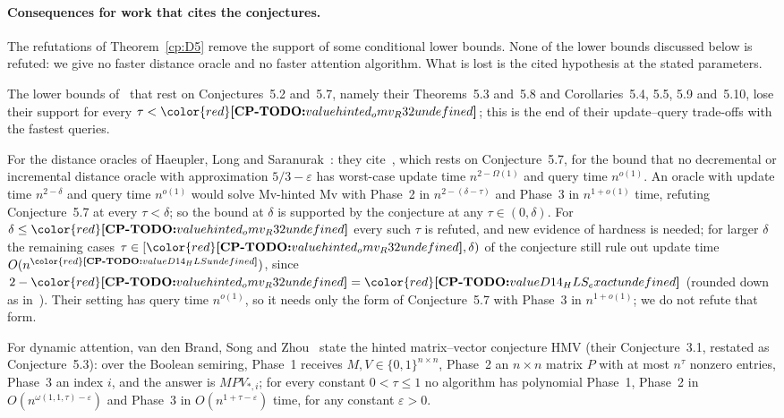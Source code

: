 \documentclass[11pt]{article}
\makeatletter
\theoremstyle{definition}
\theoremstyle{remark}
\DeclareRobustCommand{\CPTODO}[1]{{\color{red}\textbf{[CP-TODO:} #1\textbf{]}}}
\providecommand{\eps}{\varepsilon}
\newcommand{\cpv}[1]{\ifcsname cpv@#1\endcsname\csname cpv@#1\endcsname\else\CPTODO{value #1 undefined}\fi}
\makeatother
\begin{document}
\paragraph{Consequences for work that cites the conjectures.}\label{cp:D14}
The refutations of Theorem~\ref{cp:D5} remove the support of some conditional lower bounds. None of the lower bounds discussed below is refuted: we give no faster distance oracle and no faster attention algorithm. What is lost is the cited hypothesis at the stated parameters.

The lower bounds of~\cite{BNS19} that rest on Conjectures~5.2 and~5.7, namely their Theorems~5.3 and~5.8 and Corollaries~5.4, 5.5, 5.9 and~5.10, lose their support for every $\tau<\cpv{hinted_omv_R32}$; this is the end of their update--query trade-offs with the fastest queries.

For the distance oracles of Haeupler, Long and Saranurak~\cite{HLS24}: they cite~\cite[Corollary~5.10]{BNS19}, which rests on Conjecture~5.7, for the bound that no decremental or incremental distance oracle with approximation $5/3-\eps$ has worst-case update time $n^{2-\Omega(1)}$ and query time $n^{o(1)}$. An oracle with update time $n^{2-\delta}$ and query time $n^{o(1)}$ would solve Mv-hinted Mv with Phase~2 in $n^{2-(\delta-\tau)}$ and Phase~3 in $n^{1+o(1)}$ time, refuting Conjecture~5.7 at every $\tau<\delta$; so the bound at $\delta$ is supported by the conjecture at any $\tau\in(0,\delta)$. For $\delta\le\cpv{hinted_omv_R32}$ every such $\tau$ is refuted, and new evidence of hardness is needed; for larger $\delta$ the remaining cases $\tau\in[\cpv{hinted_omv_R32},\delta)$ of the conjecture still rule out update time $O(n^{\cpv{D14_HLS}})$, since $2-\cpv{hinted_omv_R32}=\cpv{D14_HLS_exact}$ (rounded down as in~\cite{v2}). Their setting has query time $n^{o(1)}$, so it needs only the form of Conjecture~5.7 with Phase~3 in $n^{1+o(1)}$; we do not refute that form.

For dynamic attention, van den Brand, Song and Zhou~\cite{BSZ24} state the hinted matrix--vector conjecture HMV (their Conjecture~3.1, restated as Conjecture~5.3): over the Boolean semiring, Phase~1 receives $M,V\in\{0,1\}^{n\times n}$, Phase~2 an $n\times n$ matrix $P$ with at most $n^\tau$ nonzero entries, Phase~3 an index $i$, and the answer is $MPV_{*,i}$; for every constant $0<\tau\le1$ no algorithm has polynomial Phase~1, Phase~2 in $O(n^{\omega(1,1,\tau)-\eps})$ and Phase~3 in $O(n^{1+\tau-\eps})$ time, for any constant $\eps>0$.
\end{document}

